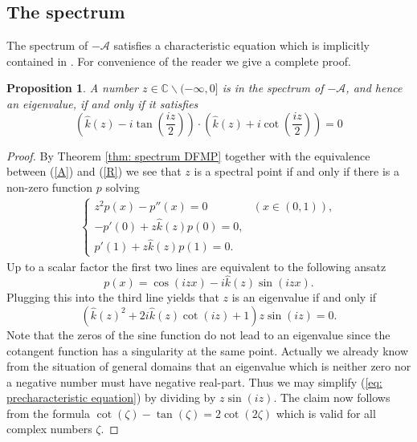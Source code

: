 \documentclass{amsart}
\newcommand{\A}{\mathcal{A}}
\newcommand{\khat}{\hat{k}}
\newcommand{\C}{\mathbb{C}}
\newtheorem{Proposition}[Theorem]{Proposition}
\begin{document}
\subsection{The spectrum}\label{sec: the spectrum}
The spectrum of $-\A$ satisfies a characteristic equation which is implicitly contained in \cite{DFMP2010b}. For convenience of the reader we give a complete proof.
\begin{Proposition}
 A number $z\in \C\backslash(-\infty,0]$ is in the spectrum of $-\A$, and hence an eigenvalue, if and only if it satisfies
 \begin{equation}\label{eq: characteristic equation 1D}
  \left(\khat(z)-i\tan\left(\frac{iz}{2}\right)\right)\cdot \left(\khat(z)+i\cot\left(\frac{iz}{2}\right)\right) = 0
 \end{equation}
\end{Proposition}
\begin{proof}
 By Theorem \ref{thm: spectrum DFMP} together with the equivalence between (\ref{A}) and (\ref{R}) we see that $z$ is a spectral point if and only if there is a non-zero function $p$ solving
 \begin{align*}
  \begin{cases}
   z^2p(x) - p''(x) = 0 & (x\in(0,1)), \\
   -p'(0) + z\khat(z)p(0) = 0, &  \\
   p'(1) + z\khat(z)p(1) = 0. & 
  \end{cases}
 \end{align*}
 Up to a scalar factor the first two lines are equivalent to the following ansatz
 \begin{equation}\nonumber
  p(x) = \cos(iz x) - i\khat(z)\sin(iz x) .
 \end{equation}
 Plugging this into the third line yields that $z$ is an eigenvalue if and only if
 \begin{equation}\label{eq: precharacteristic equation}
  \left(\khat(z)^2 + 2i\khat(z)\cot(iz) + 1\right) z\sin(iz) = 0.
 \end{equation}
 Note that the zeros of the sine function do not lead to an eigenvalue since the cotangent function has a singularity at the same point. Actually we already know from the situation of general domains that an eigenvalue which is neither zero nor a negative number must have negative real-part. Thus we may simplify (\ref{eq: precharacteristic equation}) by dividing by $z\sin(iz)$. The claim now follows from the formula $\cot(\zeta)-\tan(\zeta)=2\cot(2\zeta)$ which is valid for all complex numbers $\zeta$.
\end{proof}
\end{document}
